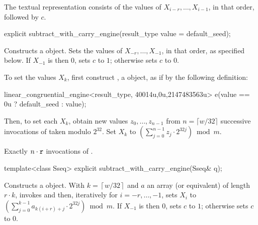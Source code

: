 \pnum
The textual representation%
%
consists of the values of
 $X_{i-r}, \ldots, X_{i-1}$,
in that order, followed by $c$.


%
\begin{itemdecl}
explicit subtract_with_carry_engine(result_type value = default_seed);
\end{itemdecl}

\begin{itemdescr}
\pnum\effects Constructs a  object.
 Sets the values of
 $ X_{-r}, \ldots, X_{-1} $,
 in that order, as specified below.
 If $X_{-1}$ is then $0$,
 sets $c$ to $1$;
 otherwise sets $c$ to $0$.

 To set the values $X_k$,
 first construct , a  object,
 as if by the following definition:
\begin{codeblock}
linear_congruential_engine<result_type,
                          40014u,0u,2147483563u> e(value == 0u ? default_seed : value);
\end{codeblock}
 Then, to set each $X_k$,
 obtain new values $ z_0, \ldots, z_{n-1} $
 from $n = \lceil w/32 \rceil $ successive invocations
 of  taken modulo $2^{32}$.
 Set $X_k$ to $ \left( \sum_{j=0}^{n-1} z_j \cdot 2^{32j}\right) \bmod m$.

\pnum\complexity Exactly $n \cdot \texttt{\protect r}$ invocations
 of .
\end{itemdescr}



%
\begin{itemdecl}
template<class Sseq> explicit subtract_with_carry_engine(Sseq& q);
\end{itemdecl}

\begin{itemdescr}
\pnum\effects Constructs a  object.
 With
 $ k = \left\lceil w / 32 \right\rceil $
 and $a$ an array (or equivalent)
 of length $ r \cdot k $,
 invokes 
 and then, iteratively for $i = -r, \ldots, -1$,
 sets $X_i$
 to $ \left(\sum_{j=0}^{k-1}a_{k(i+r)+j} \cdot 2^{32j} \right) \bmod m $.
 If $X_{-1}$ is then $0$,
 sets $c$ to $1$;
 otherwise sets $c$ to $0$.
\end{itemdescr}


